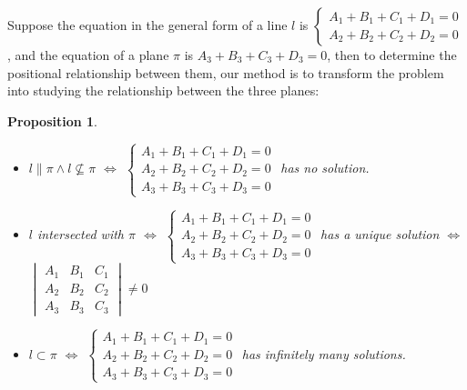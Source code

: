 \documentclass[onecolumn]{ctexart}
\newtheorem{proposition}{Proposition}
\begin{document}
Suppose the equation in the general form of a line $l$ is $
\begin{cases}
  A_1 + B_1 + C_1 + D_1 = 0 \\
  A_2 + B_2 + C_2 + D_2 = 0
\end{cases}$, and the equation of a plane $\pi$ is $A_3 + B_3 + C_3 + D_3 = 0$, 
then to determine the positional relationship between them, our method is to 
transform the problem into studying the relationship between the three planes:
\begin{proposition}
  \begin{itemize}
    \item $l \parallel \pi \wedge l \nsubseteq \pi $ $\Leftrightarrow$ $
    \begin{cases}
      A_1 + B_1 + C_1 + D_1 = 0 \\
      A_2 + B_2 + C_2 + D_2 = 0 \\
      A_3 + B_3 + C_3 + D_3 = 0
    \end{cases}$ has no solution.
    \item $l$ intersected with $\pi$ $\Leftrightarrow$ $
    \begin{cases}
      A_1 + B_1 + C_1 + D_1 = 0 \\
      A_2 + B_2 + C_2 + D_2 = 0 \\
      A_3 + B_3 + C_3 + D_3 = 0
    \end{cases}$ has a unique solution $\Leftrightarrow$ $
    \begin{vmatrix}
      A_1 & B_1 & C_1 \\
      A_2 & B_2 & C_2 \\
      A_3 & B_3 & C_3 
    \end{vmatrix} \neq 0$
    \item $l \subset \pi$ $\Leftrightarrow$ $
    \begin{cases}
      A_1 + B_1 + C_1 + D_1 = 0 \\
      A_2 + B_2 + C_2 + D_2 = 0 \\
      A_3 + B_3 + C_3 + D_3 = 0
    \end{cases}$ has infinitely many solutions.
  \end{itemize}
\end{proposition}
\end{document}
